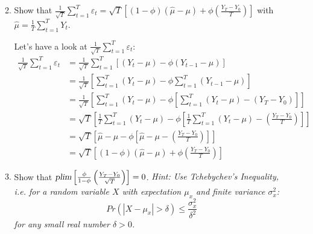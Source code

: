 \begin{enumerate}
\begin{enumerate}
\begin{solution}
\begin{equation*}
                        \end{equation*}
                    \end{solution}
              \item Show that
                    $
                        \frac{1}{\sqrt{T}} \sum_{t=1}^T \varepsilon_t = \sqrt{T}\left[(1-\phi)\left(\hat{\mu}-\mu\right) + \phi\left(\frac{Y_T - Y_0}{T}\right)\right]
                    $
                    with $\hat{\mu} =\frac{1}{T}\sum_{t=1}^{T}Y_{t}$.
                    \begin{solution}
                        Let's have a look at $\frac{1}{\sqrt{T}} \sum_{t=1}^T \varepsilon_t$:
                        \begin{align*}
                            \frac{1}{\sqrt{T}} \sum_{t=1}^T \varepsilon_t
                             & = \frac{1}{\sqrt{T}} \sum_{t=1}^T \left[(Y_t-\mu)-\phi(Y_{t-1}-\mu)\right]                                                                      \\
                             & = \frac{1}{\sqrt{T}} \left[\sum_{t=1}^T (Y_t-\mu)- \phi\sum_{t=1}^T(Y_{t-1}-\mu)\right]                                                         \\
                             & = \frac{1}{\sqrt{T}} \left[\sum_{t=1}^T (Y_t-\mu)- \phi\left[\sum_{t=1}^T(Y_{t}-\mu)-(Y_T - Y_0)\right]\right]                                  \\
                             & = \sqrt{T} \left[\frac{1}{T}\sum_{t=1}^T (Y_t-\mu)- \phi\left[\frac{1}{T}\sum_{t=1}^T(Y_{t}-\mu)-\left(\frac{Y_T - Y_0}{T}\right)\right]\right] \\
                             & = \sqrt{T} \left[\hat{\mu}-\mu- \phi\left[\hat{\mu}-\mu-\left(\frac{Y_T - Y_0}{T}\right)\right]\right]                                          \\
                             & = \sqrt{T}\left[(1-\phi)\left(\hat{\mu}-\mu\right) + \phi\left(\frac{Y_T - Y_0}{T}\right)\right]
                        \end{align*}
                    \end{solution}
              \item Show that
                    $
                        \textsl{plim}\left[\frac{\phi}{1-\phi}\left(\frac{Y_T - Y_0}{\sqrt{T}}\right)\right] = 0
                    $.
                    \emph{Hint: Use Tchebychev's Inequality, i.e. for a random variable $X$ with expectation $\mu_x$ and finite variance $\sigma_x^2$: $$Pr(|X-\mu_x|> \delta) \leq \frac{\sigma_x^2}{\delta^2}$$ for any small real number $\delta>0$.}

\end{enumerate}
\end{enumerate}
